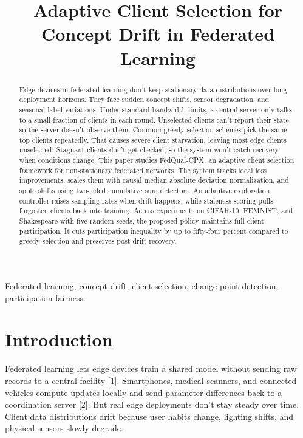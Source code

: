 \documentclass[conference]{IEEEtran}
\begin{document}
\title{Adaptive Client Selection for Concept Drift in Federated Learning}

\author{
}

\maketitle

\begin{abstract}
Edge devices in federated learning don't keep stationary data distributions over long deployment horizons. They face sudden concept shifts, sensor degradation, and seasonal label variations. Under standard bandwidth limits, a central server only talks to a small fraction of clients in each round. Unselected clients can't report their state, so the server doesn't observe them. Common greedy selection schemes pick the same top clients repeatedly. That causes severe client starvation, leaving most edge clients unselected. Stagnant clients don't get checked, so the system won't catch recovery when conditions change. This paper studies FedQual-CPX, an adaptive client selection framework for non-stationary federated networks. The system tracks local loss improvements, scales them with causal median absolute deviation normalization, and spots shifts using two-sided cumulative sum detectors. An adaptive exploration controller raises sampling rates when drift happens, while staleness scoring pulls forgotten clients back into training. Across experiments on CIFAR-10, FEMNIST, and Shakespeare with five random seeds, the proposed policy maintains full client participation. It cuts participation inequality by up to fifty-four percent compared to greedy selection and preserves post-drift recovery.
\end{abstract}

\begin{IEEEkeywords}
Federated learning, concept drift, client selection, change point detection, participation fairness.
\end{IEEEkeywords}

\section{Introduction}
Federated learning lets edge devices train a shared model without sending raw records to a central facility [1]. Smartphones, medical scanners, and connected vehicles compute updates locally and send parameter differences back to a coordination server [2]. But real edge deployments don't stay steady over time. Client data distributions drift because user habits change, lighting shifts, and physical sensors slowly degrade.
\end{document}
